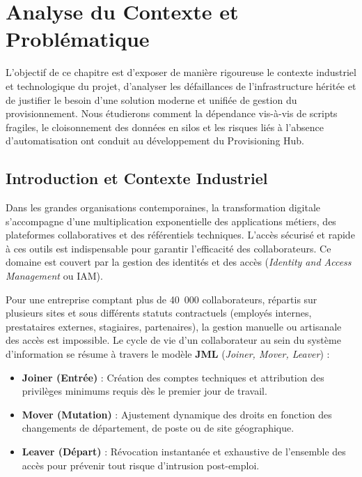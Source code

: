 \chapter{Analyse du Contexte et Problématique}
\label{chap:contexte}

L'objectif de ce chapitre est d'exposer de manière rigoureuse le contexte industriel et technologique du projet, d'analyser les défaillances de l'infrastructure héritée et de justifier le besoin d'une solution moderne et unifiée de gestion du provisionnement. Nous étudierons comment la dépendance vis-à-vis de scripts fragiles, le cloisonnement des données en silos et les risques liés à l'absence d'automatisation ont conduit au développement du Provisioning Hub.

\section{Introduction et Contexte Industriel}

Dans les grandes organisations contemporaines, la transformation digitale s'accompagne d'une multiplication exponentielle des applications métiers, des plateformes collaboratives et des référentiels techniques. L'accès sécurisé et rapide à ces outils est indispensable pour garantir l'efficacité des collaborateurs. Ce domaine est couvert par la gestion des identités et des accès (\textit{Identity and Access Management} ou IAM).

Pour une entreprise comptant plus de 40~000 collaborateurs, répartis sur plusieurs sites et sous différents statuts contractuels (employés internes, prestataires externes, stagiaires, partenaires), la gestion manuelle ou artisanale des accès est impossible. Le cycle de vie d'un collaborateur au sein du système d'information se résume à travers le modèle \textbf{JML} (\textit{Joiner, Mover, Leaver}) :
\begin{itemize}
    \item \textbf{Joiner (Entrée)} : Création des comptes techniques et attribution des privilèges minimums requis dès le premier jour de travail.
    \item \textbf{Mover (Mutation)} : Ajustement dynamique des droits en fonction des changements de département, de poste ou de site géographique.
    \item \textbf{Leaver (Départ)} : Révocation instantanée et exhaustive de l'ensemble des accès pour prévenir tout risque d'intrusion post-emploi.
\end{itemize}

